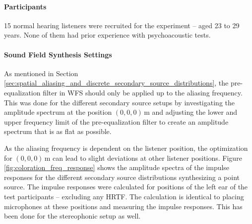 \paragraph{Participants}
%
15 normal hearing listeners were recruited for the experiment -- aged 23 to 29 years. None of
them had prior experience with psychoacoustic tests.

\paragraph{Sound Field Synthesis Settings}
%
As mentioned in
Section\,\ref{sec:spatial_aliasing_and_discrete_secondary_source_distributions},
the pre-\-equali\-zat\-ion filter in \ac{WFS} should only be applied up to the aliasing frequency.
This was done for the different secondary source setups by investigating the
amplitude spectrum at the position $(0,0,0)$\,m and adjusting the lower and
upper frequency limit of the pre-\-equali\-zat\-ion filter to create an amplitude
spectrum that is as flat as possible.
%
\begin{figure*}
    \small
    \centering
    
    \caption{Amplitude spectra for the varying secondary source distribution
    conditions. The spectra was simulated for the place of the left ear of
    the listener. The left graph shows the spectra
    for the central listening position, the right for the off-center position.
    The distance between the secondary sources is given for all \ac{WFS}
    spectra.
    The spectra are shifted in absolute magnitude in order to meaningfully display
    them.
    Parameters: $\xs = (0,2.5,0)$, $\xref = (0,0,0)$\,m, circular secondary
    source distribution with a diameter of $3$\,m.
    }
    \label{fig:coloration_freq_response}
\end{figure*}
%
As the aliasing frequency is dependent on the listener position, the optimization
for $(0,0,0)$\,m can lead to slight deviations at other listener positions.
Figure\,\ref{fig:coloration_freq_response} shows the amplitude spectra of the
impulse responses for the different secondary source distributions synthesizing
a point source. The impulse responses were calculated for positions of the left
ear of the test participants -- excluding any \ac{HRTF}.
The calculation is identical to placing microphones
at these positions and measuring the impulse responses.
This has been done for the stereophonic setup as well.

